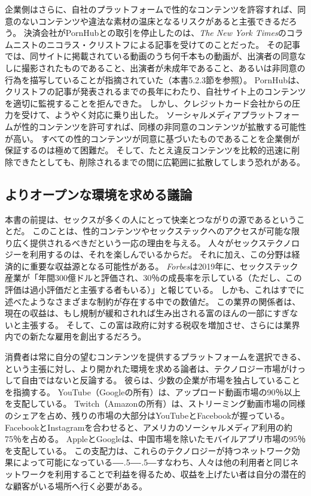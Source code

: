 \documentclass[paper=a4,book,openany]{jlreq}
\newcommand{\ig}[1]{}           %
\def\DDASH{―\kern-.5\zw―\kern-.5\zw―}
\begin{document}
企業側はさらに、自社のプラットフォームで性的なコンテンツを許容すれば、同意のないコンテンツや違法な素材の温床となるリスクがあると主張できるだろう。
決済会社がPornHubとの取引を停止したのは、\emph{The New York Times}のコラムニストのニコラス・クリストフ\ig{Nicholas Kristof}による記事を受けてのことだった。
その記事では、同サイトに掲載されている動画のうち何千本もの動画が、出演者の同意なしに撮影されたものであること、出演者が未成年であること、あるいは非同意の行為を描写していることが指摘されていた（本書5.2.3節を参照）。
PornHubは、クリストフの記事が発表されるまでの長年にわたり、自社サイト上のコンテンツを適切に監視することを拒んできた。
しかし、クレジットカード会社からの圧力を受けて、ようやく対応に乗り出した。
ソーシャルメディアプラットフォームが性的コンテンツを許可すれば、同様の非同意のコンテンツが拡散する可能性が高い。
すべての性的コンテンツが同意に基づいたものであることを企業側が保証するのは極めて困難だ。
そして、たとえ違反コンテンツを比較的迅速に削除できたとしても、削除されるまでの間に広範囲に拡散してしまう恐れがある。

\subsection{よりオープンな環境を求める議論}

本書の前提は、セックスが多くの人にとって快楽とつながりの源であるということだ。
このことは、性的コンテンツやセックステックへのアクセスが可能な限り広く提供されるべきだという一応の理由を与える。
人々がセックステクノロジーを利用するのは、それを楽しんでいるからだ。
それに加え、この分野は経済的に重要な収益源となる可能性がある。
\emph{Forbes}は2019年に、セックステック産業が「年間300億ドルと評価され、30％の成長率を示している（ただし、この評価は過小評価だと主張する者もいる）」と報じている\citep{jaramillo19:_inves_sextec}。
しかも、これはすでに述べたようなさまざまな制約が存在する中での数値だ。
この業界の関係者は、現在の収益は、もし規制が緩和されれば生み出される富のほんの一部にすぎないと主張する。
そして、この富は政府に対する税収を増加させ、さらには業界内での新たな雇用を創出するだろう。

消費者は常に自分の望むコンテンツを提供するプラットフォームを選択できる、という主張に対し、より開かれた環境を求める論者は、テクノロジー市場がけっして自由ではないと反論する。
彼らは、少数の企業が市場を独占していることを指摘する。
YouTube（Googleの所有）は、アップロード動画市場の90％以上を支配している。
Twitch（Amazonの所有）は、ストリーミング動画市場の同様のシェアを占め、残りの市場の大部分はYouTubeとFacebookが握っている。
FacebookとInstagramを合わせると、アメリカのソーシャルメディア利用の約75％を占める\citep{department21:_us_market}。
AppleとGoogleは、中国市場を除いたモバイルアプリ市場の95％を支配している\citep{curry21:_app_store_data}。
この支配力は、これらのテクノロジーが持つネットワーク効果によって可能になっている{\DDASH}すなわち、人々は他の利用者と同じネットワークを利用することで利益を得るため、収益を上げたい者は自分の潜在的な顧客がいる場所へ行く必要がある。
\end{document}
